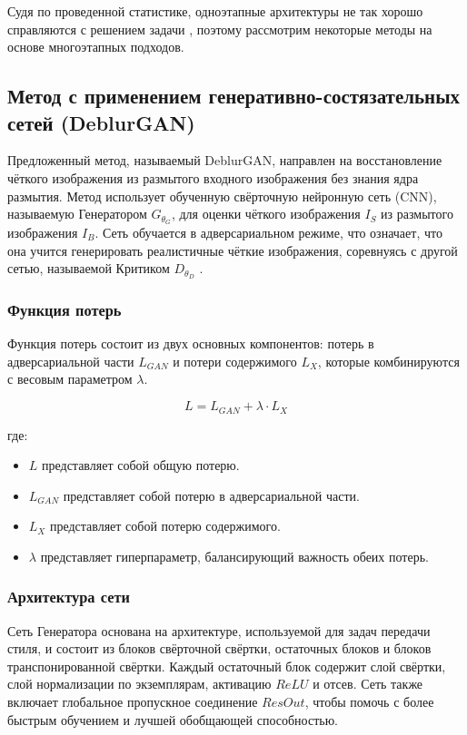 Судя по проведенной статистике, одноэтапные архитектуры не так хорошо справляются с решением задачи \cite{zamir2021multi}, поэтому рассмотрим некоторые методы на основе многоэтапных подходов.

\subsection{Метод с применением генеративно-состязательных сетей (DeblurGAN)}

Предложенный метод, называемый DeblurGAN, направлен на восстановление чёткого изображения из размытого входного изображения без знания ядра размытия. Метод использует обученную свёрточную нейронную сеть (CNN), называемую Генератором \(G_{\theta_{G}}\), для оценки чёткого изображения \(I_{S}\) из размытого изображения \(I_{B}\). Сеть обучается в адверсариальном режиме, что означает, что она учится генерировать реалистичные чёткие изображения, соревнуясь с другой сетью, называемой Критиком \(D_{\theta_{D}}\) \cite{kupyn2018deblurgan}.

\subsubsection*{Функция потерь}

Функция потерь состоит из двух основных компонентов: потерь в адверсариальной части \(L_{GAN}\) и потери содержимого \(L_{X}\), которые комбинируются с весовым параметром \(\lambda\).

\begin{equation}
	L = L_{GAN} + \lambda \cdot L_{X}
\end{equation}

где:
\begin{itemize}
	\item \(L\) представляет собой общую потерю.
	\item \(L_{GAN}\) представляет собой потерю в адверсариальной части.
	\item \(L_{X}\) представляет собой потерю содержимого.
	\item \(\lambda\) представляет гиперпараметр, балансирующий важность обеих потерь.
\end{itemize}

\subsubsection*{Архитектура сети}

Сеть Генератора основана на архитектуре, используемой для задач передачи стиля, и состоит из блоков свёрточной свёртки, остаточных блоков и блоков транспонированной свёртки. Каждый остаточный блок содержит слой свёртки, слой нормализации по экземплярам, активацию \(ReLU\) и отсев. Сеть также включает глобальное пропускное соединение \(ResOut\), чтобы помочь с более быстрым обучением и лучшей обобщающей способностью.

